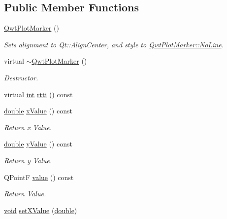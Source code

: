 \subsection*{Public Member Functions}
\begin{DoxyCompactItemize}
\item 
\hyperlink{class_qwt_plot_marker_a86eeb61f8f50e879569a439f8d6ab912}{Qwt\-Plot\-Marker} ()
\begin{DoxyCompactList}\small\item\em Sets alignment to Qt\-::\-Align\-Center, and style to \hyperlink{class_qwt_plot_marker_a297efa835423bfa5a870bbc8ff1c623ba5407403ea223539c7cac264a9fff5fe0}{Qwt\-Plot\-Marker\-::\-No\-Line}. \end{DoxyCompactList}\item 
virtual \hyperlink{class_qwt_plot_marker_a920d2ddeb2041c03790d7c173e3ad0cf}{$\sim$\-Qwt\-Plot\-Marker} ()
\begin{DoxyCompactList}\small\item\em Destructor. \end{DoxyCompactList}\item 
virtual \hyperlink{ioapi_8h_a787fa3cf048117ba7123753c1e74fcd6}{int} \hyperlink{class_qwt_plot_marker_a4e48032adf8bdda1aacba4977280123f}{rtti} () const 
\item 
\hyperlink{_super_l_u_support_8h_a8956b2b9f49bf918deed98379d159ca7}{double} \hyperlink{class_qwt_plot_marker_aad43f527f3c0033865fea5a488ef3857}{x\-Value} () const 
\begin{DoxyCompactList}\small\item\em Return x Value. \end{DoxyCompactList}\item 
\hyperlink{_super_l_u_support_8h_a8956b2b9f49bf918deed98379d159ca7}{double} \hyperlink{class_qwt_plot_marker_a30ec999a3e4eba759d4c405fa92f9563}{y\-Value} () const 
\begin{DoxyCompactList}\small\item\em Return y Value. \end{DoxyCompactList}\item 
Q\-Point\-F \hyperlink{class_qwt_plot_marker_a2dd71303454a3437b064216b9f729ac7}{value} () const 
\begin{DoxyCompactList}\small\item\em Return Value. \end{DoxyCompactList}\item 
\hyperlink{group___u_a_v_objects_plugin_ga444cf2ff3f0ecbe028adce838d373f5c}{void} \hyperlink{class_qwt_plot_marker_a0d53b0e0ed8b48478c02a0ecaf5852b2}{set\-X\-Value} (\hyperlink{_super_l_u_support_8h_a8956b2b9f49bf918deed98379d159ca7}{double})

\end{DoxyCompactItemize}
